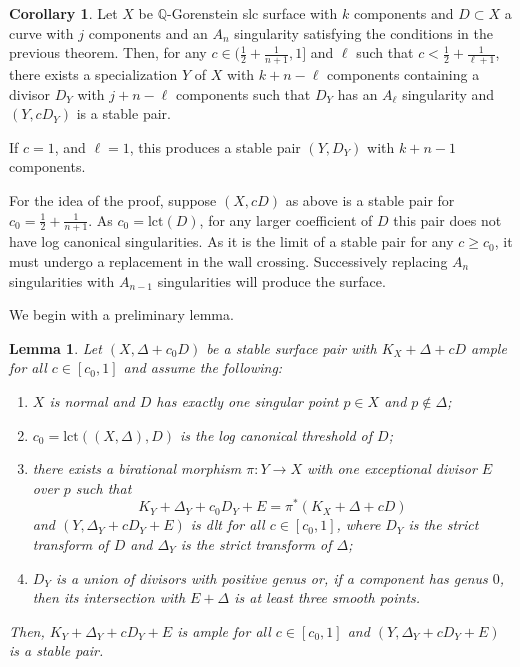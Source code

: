 \documentclass[11pt]{amsart}
\numberwithin{equation}{section}
\newtheorem{lemma}[theorem]{Lemma}
\theoremstyle{definition}
\newtheorem{corollary}[theorem]{Corollary}
\newcommand{\bQ}{\mathbb{Q}}
\newcommand{\lct}{\mathrm{lct}}
\begin{document}
\begin{corollary}\label{cor:manycomps}
    Let $X$ be $\bQ$-Gorenstein slc surface with $k$ components and $D \subset X$ a curve with $j$ components and an $A_n$ singularity satisfying the conditions in the previous theorem.  Then, for any $c \in (\frac{1}{2} + \frac{1}{n+1}, 1]$ and $\ell$ such that $c <\frac{1}{2} + \frac{1}{\ell+1}$, there exists a specialization $Y$ of $X$ with $k+n -\ell$ components containing a divisor $D_Y$ with $j + n - \ell$ components such that $D_Y$ has an $A_\ell$ singularity and $(Y, c D_Y)$ is a stable pair.

    If $c = 1$, and $\ell = 1$, this produces a stable pair $(Y,D_Y)$ with $k+n -1$ components. 
\end{corollary}


For the idea of the proof, suppose $(X,cD)$ as above is a stable pair for $c_0 = \frac{1}{2} + \frac{1}{n+1}$.  As $c_0 = \lct(D)$, for any larger coefficient of $D$ this pair does not have log canonical singularities.  As it is the limit of a stable pair for any $c \ge c_0$, it must undergo a replacement in the wall crossing.  Successively replacing $A_n$ singularities with $A_{n-1}$ singularities will produce the surface. 

We begin with a preliminary lemma. 

\begin{lemma}\label{lem:ampleforc>c0}
    Let $(X,\Delta +c_0D)$ be a stable surface pair with $K_X + \Delta + cD$ ample for all $c \in [c_0,1]$ and assume the following: 
        \begin{enumerate}
            \item $X$ is normal and $D$ has exactly one singular point $p \in X$ and $p \notin \Delta$;
            \item $c_0 = \lct((X, \Delta), D)$ is the log canonical threshold of $D$;
            \item there exists a birational morphism $\pi: Y \to X$ with one exceptional divisor $E$ over $p$ such that
            \[K_Y + \Delta_Y + c_0 D_Y + E = \pi^*(K_X + \Delta + cD) \] and
            $(Y,\Delta_Y + cD_Y+E)$ is dlt for all $c \in [c_0,1]$, where $D_Y$ is the strict transform of $D$ and $\Delta_Y$ is the strict transform of $\Delta$;
            \item $D_Y$ is a union of divisors with positive genus or, if a component has genus $0$, then its intersection with $E + \Delta$ is at least three smooth points.
        \end{enumerate}
    Then, $K_Y + \Delta_Y+ cD_Y + E$ is ample for all $c \in [c_0,1]$ and $(Y,\Delta_Y + cD_Y + E)$ is a stable pair. 
\end{lemma}
\end{document}
